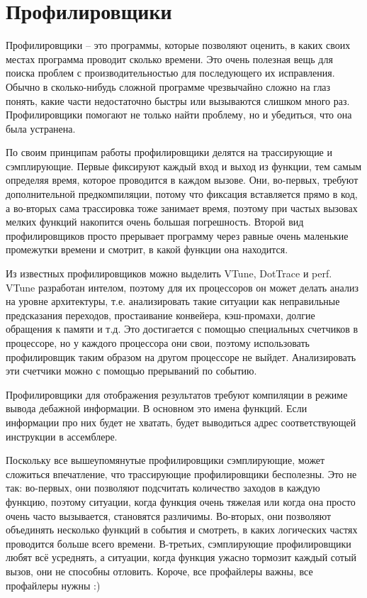 \documentclass[12pt, a4paper]{article}
\begin{document}
\section{Профилировщики}
Профилировщики -- это программы, которые позволяют оценить, в каких своих местах программа проводит сколько времени. Это очень полезная вещь для поиска проблем с производительностью для последующего их исправления. Обычно в сколько-нибудь сложной программе чрезвычайно сложно на глаз понять, какие части недостаточно быстры или вызываются слишком много раз. Профилировщики помогают не только найти проблему, но и убедиться, что она была устранена.
\par По своим принципам работы профилировщики делятся на трассирующие и сэмплирующие. Первые фиксируют каждый вход и выход из функции, тем самым определяя время, которое проводится в каждом вызове. Они, во-первых, требуют дополнительной предкомпиляции, потому что фиксация вставляется прямо в код, а во-вторых сама трассировка тоже занимает время, поэтому при частых вызовах мелких функций накопится очень большая погрешность. Второй вид профилировщиков просто прерывает программу через равные очень маленькие промежутки времени и смотрит, в какой функции она находится.
\par Из известных профилировщиков можно выделить VTune, DotTrace и perf. VTune разработан интелом, поэтому для их процессоров он может делать анализ на уровне архитектуры, т.е. анализировать такие ситуации как неправильные предсказания переходов, простаивание конвейера, кэш-промахи, долгие обращения к памяти и т.д. Это достигается с помощью специальных счетчиков в процессоре, но у каждого процессора они свои, поэтому использовать профилировщик таким образом на другом процессоре не выйдет. Анализировать эти счетчики можно с помощью прерываний по событию.
\par Профилировщики для отображения результатов требуют компиляции в режиме вывода дебажной информации. В основном это имена функций. Если информации про них будет не хватать, будет выводиться адрес соответствующей инструкции в ассемблере.
\par Поскольку все вышеупомянутые профилировщики сэмплирующие, может сложиться впечатление, что трассирующие профилировщики бесполезны. Это не так: во-первых, они позволяют подсчитать количество заходов в каждую функцию, поэтому ситуации, когда функция очень тяжелая или когда она просто очень часто вызывается, становятся различимы. Во-вторых, они позволяют объединять несколько функций в события и смотреть, в каких логических частях проводится больше всего времени. В-третьих, сэмплирующие профилировщики любят всё усреднять, а ситуации, когда функция ужасно тормозит каждый сотый вызов, они не способны отловить. Короче, все профайлеры важны, все профайлеры нужны :)
\end{document}
